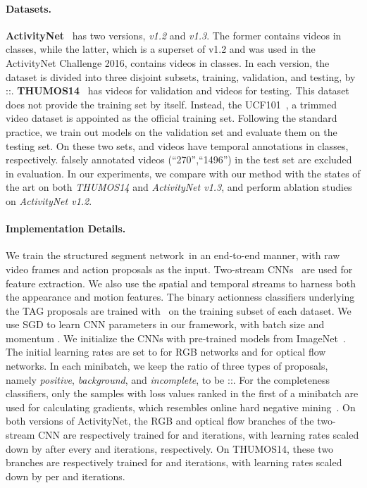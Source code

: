 \documentclass[10pt,twocolumn,letterpaper]{article}
\newcommand{\SSN}{structured segment network}
\begin{document}
\paragraph{Datasets.}
\textbf{ActivityNet}~\cite{caba2015activitynet} has two versions, \emph{v1.2} and \emph{v1.3}.
The former contains  videos in  classes, while the latter, which is a superset of v1.2 and
was used in the ActivityNet Challenge 2016, contains  videos in  classes.
In each version, the dataset is divided into three disjoint subsets,
training, validation, and testing, by ::.
\textbf{THUMOS14}~\cite{Jiang2014THUMOS14} has  videos for validation and  videos for testing.
This dataset does not provide the training set by itself.
Instead, the UCF101~\cite{Soomro2012Ucf101}, a trimmed video dataset is appointed as the official training set.
Following the standard practice, we train out models on the validation set and evaluate them
on the testing set.
On these two sets,  and  videos have temporal annotations in  classes, respectively.  falsely annotated videos (``270'',``1496'') in the test set are excluded in evaluation.
In our experiments,
we compare with our method with the states of the art on both
\emph{THUMOS14} and \emph{ActivityNet v1.3},
and perform ablation studies on \emph{ActivityNet v1.2}.

\vspace{-12pt}
\paragraph{Implementation Details.}
We train the \SSN~in an end-to-end manner,
with raw video frames and action proposals as the input.
Two-stream CNNs~\cite{Simonyan14TwoStream} are used for feature extraction.
We also use the spatial and temporal streams to harness both the appearance and motion features.
The binary actionness classifiers underlying the TAG proposals are trained with~\cite{Wang2016TSN} on the training subset of each dataset.
We use SGD to learn CNN parameters in our framework, with batch size  and momentum .
We initialize the CNNs with pre-trained models from ImageNet~\cite{Deng2009ImageNet}.
The initial learning rates are set to  for RGB networks and  for optical flow networks.
In each minibatch, we keep the ratio of three types of proposals, namely
\emph{positive}, \emph{background}, and \emph{incomplete}, to be ::.
For the completeness classifiers, only the samples with loss values ranked in the first  of a minibatch are used for calculating gradients, which resembles online hard negative mining~\cite{Shrivastava2016OHNM}.
On both versions of ActivityNet, the RGB and optical flow branches of the two-stream CNN
are respectively trained for  and  iterations,
with learning rates scaled down by  after every  and  iterations, respectively.
On THUMOS14, these two branches are respectively trained for  and  iterations,
with learning rates scaled down by  per  and  iterations.
\end{document}
